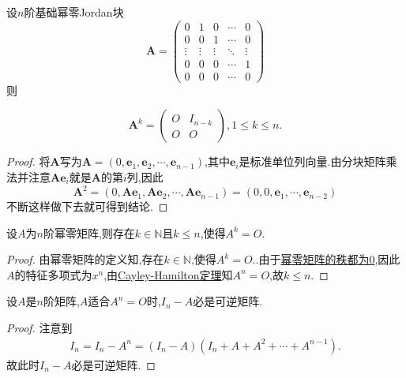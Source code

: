 \documentclass[../../main.tex]{subfiles}%
\begin{document}
\begin{proposition}[基础幂零Jordan块]\label{proposition:基础幂零Jordan块}
设\(n\)阶基础幂零Jordan块
\[
\boldsymbol{A}=\left(\begin{array}{ccccc}
0 & 1 & 0 & \cdots & 0 \\
0 & 0 & 1 & \cdots & 0 \\
\vdots & \vdots & \vdots & \ddots & \vdots \\
0 & 0 & 0 & \cdots & 1 \\
0 & 0 & 0 & \cdots & 0
\end{array}\right)
\]
则

\[
\boldsymbol{A}^{k}=\left(\begin{array}{cc}
O & I_{n - k} \\
O & O
\end{array}\right),1 \leqslant  k \leqslant  n.
\]
\end{proposition}
\begin{proof}
将\(\boldsymbol{A}\)写为\(\boldsymbol{A}=(0,\mathbf{e}_{1},\mathbf{e}_{2},\cdots,\mathbf{e}_{n - 1})\),其中\(\mathbf{e}_{i}\)是标准单位列向量.由分块矩阵乘法并注意\(\boldsymbol{A}\mathbf{e}_{i}\)就是\(\boldsymbol{A}\)的第\(i\)列,因此
\[
\boldsymbol{A}^{2}=(0,\boldsymbol{A}\mathbf{e}_{1},\boldsymbol{A}\mathbf{e}_{2},\cdots,\boldsymbol{A}\mathbf{e}_{n - 1})=(0,0,\mathbf{e}_{1},\cdots,\mathbf{e}_{n - 2})
\]
不断这样做下去就可得到结论.
\end{proof}

\begin{proposition}
设$A$为$n$阶幂零矩阵,则存在$k\in \mathbb{N}$且$k\leqslant n$,使得$A^k=O.$
\end{proposition}
\begin{proof}
由幂零矩阵的定义知,存在$k\in \mathbb{N}$,使得$A^k=O.$.由于\hyperref[proposition:幂零矩阵关于特征值的充要条件]{幂零矩阵的秩都为0},因此$A$的特征多项式为$x^n$,由\hyperref[theorem:Cayley-Hamilton定理]{Cayley-Hamilton定理}知$A^n=O$,故$k\leqslant n.$
\end{proof}

\begin{example}\label{example:56471456}
设\(A\)是\(n\)阶矩阵,\(A\)适合\(A^n = O\)时,\(I_n - A\)必是可逆矩阵.
\end{example}
\begin{proof}
注意到
\begin{align*}
I_n=I_n-A^n=\left( I_n-A \right) \left( I_n+A+A^2+\cdots +A^{n-1} \right) .
\end{align*}
故此时\(I_n - A\)必是可逆矩阵.
\end{proof}
\end{document}
